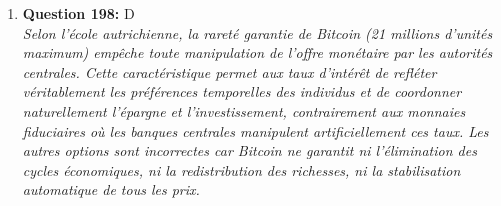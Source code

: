 \documentclass[12pt,a4paper]{article}
\begin{document}
\begin{enumerate}
\item \textbf{Question 198:} D
\\ \textit{Selon l'école autrichienne, la rareté garantie de Bitcoin (21 millions d'unités maximum) empêche toute manipulation de l'offre monétaire par les autorités centrales. Cette caractéristique permet aux taux d'intérêt de refléter véritablement les préférences temporelles des individus et de coordonner naturellement l'épargne et l'investissement, contrairement aux monnaies fiduciaires où les banques centrales manipulent artificiellement ces taux. Les autres options sont incorrectes car Bitcoin ne garantit ni l'élimination des cycles économiques, ni la redistribution des richesses, ni la stabilisation automatique de tous les prix.}


\end{enumerate}
\end{document}
